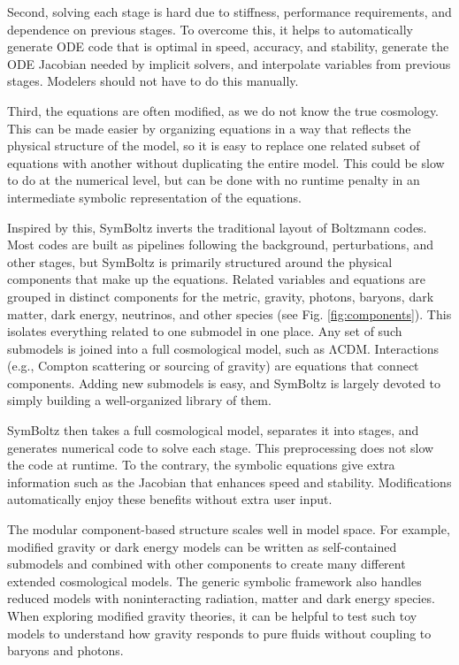 \documentclass{aa}
\newcommand{\LCDM}{$\mathrm{\Lambda C D M}$}
\begin{document}
Second, solving each stage is hard due to stiffness, performance requirements, and dependence on previous stages.
To overcome this, it helps to automatically generate ODE code that is optimal in speed, accuracy, and stability, generate the ODE Jacobian needed by implicit solvers, and interpolate variables from previous stages.
Modelers should not have to do this manually.

Third, the equations are often modified, as we do not know the true cosmology.
This can be made easier by organizing equations in a way that reflects the physical structure of the model, so it is easy to replace one related subset of equations with another without duplicating the entire model.
This could be slow to do at the numerical level, but can be done with no runtime penalty in an intermediate symbolic representation of the equations.

Inspired by this, SymBoltz inverts the traditional layout of Boltzmann codes.
Most codes are built as pipelines following the background, perturbations, and other stages,
but SymBoltz is primarily structured around the physical components that make up the equations.
Related variables and equations are grouped in distinct components for the metric, gravity, photons, baryons, dark matter, dark energy, neutrinos, and other species (see Fig. \ref{fig:components}).
This isolates everything related to one submodel in one place.
Any set of such submodels is joined into a full cosmological model, such as \LCDM{}.
Interactions (e.g., Compton scattering or sourcing of gravity) are equations that connect components.
Adding new submodels is easy, and SymBoltz is largely devoted to simply building a well-organized library of them.

SymBoltz then takes a full cosmological model, separates it into stages, and generates numerical code to solve each stage.
This preprocessing does not slow the code at runtime.
To the contrary, the symbolic equations give extra information such as the Jacobian that enhances speed and stability.
Modifications automatically enjoy these benefits without extra user input.

The modular component-based structure scales well in model space.
For example, modified gravity or dark energy models can be written as self-contained submodels and combined with other components to create many different extended cosmological models.
The generic symbolic framework also handles reduced models with noninteracting radiation, matter and dark energy species.
When exploring modified gravity theories, it can be helpful to test such toy models to understand how gravity responds to pure fluids without coupling to baryons and photons.
\end{document}
